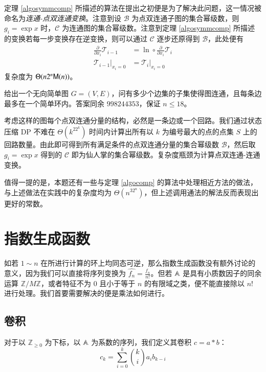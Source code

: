 定理 \ref{algosymmcomp} 所描述的算法在提出之初便是为了解决此问题，这一情况被命名为\emph{连通-点双连通变换}。注意到设 $\mathscr B$ 为点双连通子图的集合幂级数，则 $g_i = \exp x$ 时，$\mathscr C$ 为连通图的集合幂级数。注意到定理 \ref{algosymmcomp} 所描述的变换若每一步变换存在逆变换，则可以通过 $\mathscr C$ 逐步还原得到 $\mathscr B$，此处便有
\begin{align*}
\frac{\partial}{\partial x_i} \mathscr T_{i-1} &= \ln \circ \frac{\partial}{\partial x_i}\mathscr T_i\\
\left.\mathscr T_{i-1}\right|_{x_i=0} &= \left.\mathscr T_i\right|_{x_i=0}
\end{align*}
复杂度为 $\Theta(n2^n\mathsf M(n))$。

\begin{problem}
给出一个无向简单图 $G=(V,E)$，问有多少个边集的子集使得图连通，且每条边最多在一个简单环内。答案同余 $998244353$，保证 $n\le 18$。
\end{problem}

\begin{solution}
考虑这样的图每个点双连通分量的结构，必然是一条边或一个回路。我们通过状态压缩 DP 不难在 $\Theta(k^22^k)$ 时间内计算出所有以 $k$ 为编号最大的点的点集 $S$ 上的回路数量。由此即可得到所有满足条件的点双连通分量的集合幂级数 $\mathscr B$，然后取 $g_i = \exp x$ 得到的 $\mathscr C$ 即为仙人掌的集合幂级数。复杂度瓶颈为计算点双连通-连通变换。
\end{solution}

值得一提的是，本题还有一些与定理 \ref{algocomp} 的算法中处理相近方法的做法，与上述做法在实践中的复杂度均为 $\Theta(n^32^n)$，但上述调用通法的解法反而表现出更好的常数。

\section{指数生成函数}

如若 $1\sim n$ 在所进行计算的环上均同态可逆，那么指数生成函数没有额外讨论的意义，因为我们可以直接将序列变换为 $\widehat {f_n} = \frac {f_n}{n!}$。但若 $\mathbb A$ 是具有小质数因子的同余运算 $\mathbb Z/M\mathbb Z$，或者特征不为 $0$ 且小于等于 $n$ 的有限域之类，便不能直接除以 $n!$ 进行处理。我们首要需要解决的便是乘法如何进行。

\subsection{卷积}

\begin{definition}[二项卷积]
对于以 $\mathbb Z_{\ge 0}$ 为下标，以 $\mathbb A$ 为系数的序列，我们定义其卷积 $c = a * b$：
$$
c_k = \sum_{i = 0}^k \binom k i a_i b_{k-i}
$$
\end{definition}


